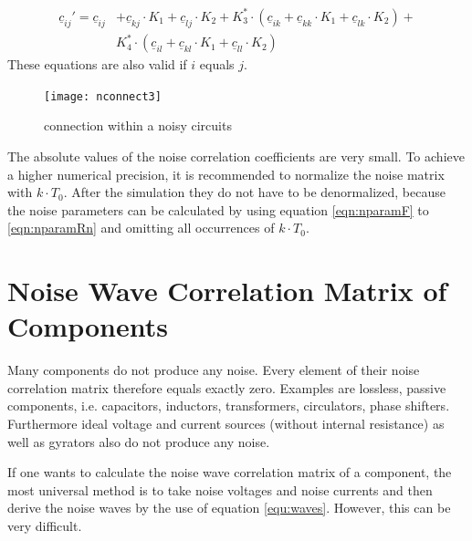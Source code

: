 \documentclass[10pt]{report}
\begin{document}
\begin{equation}
\begin{split}
\underline{c}_{ij}' = \underline{c}_{ij} &+ \underline{c}_{kj}\cdot K_1 + \underline{c}_{lj}\cdot K_2
   + K_3^*\cdot(\underline{c}_{ik} + \underline{c}_{kk}\cdot K_1 + \underline{c}_{lk}\cdot K_2) + \\
    &K_4^*\cdot(\underline{c}_{il} + \underline{c}_{kl}\cdot K_1 + \underline{c}_{ll}\cdot K_2)
\end{split}
\end{equation}
These equations are also valid if $i$ equals $j$.

\begin{figure}[ht]
\begin{center}
\texttt{[image: nconnect3]}
\end{center}
\caption{connection within a noisy circuits}
\label{fig:nconnect3}
\end{figure}
\FloatBarrier

The absolute values of the noise correlation coefficients are very
small.  To achieve a higher numerical precision, it is recommended to
normalize the noise matrix with $k\cdot T_0$. After the simulation
they do not have to be denormalized, because the noise parameters can
be calculated by using equation \eqref{eqn:nparamF} to
\eqref{eqn:nparamRn} and omitting all occurrences of $k\cdot T_0$.


\section{Noise Wave Correlation Matrix of Components}

Many components do not produce any noise.  Every element of their
noise correlation matrix therefore equals exactly zero.  Examples are
lossless, passive components, i.e. capacitors, inductors,
transformers, circulators, phase shifters.  Furthermore ideal voltage
and current sources (without internal resistance) as well as gyrators
also do not produce any noise.

\addvspace{12pt}

If one wants to calculate the noise wave correlation matrix of a
component, the most universal method is to take noise voltages and
noise currents and then derive the noise waves by the use of equation
\eqref{equ:waves}.  However, this can be very difficult.

\addvspace{12pt}
\end{document}
